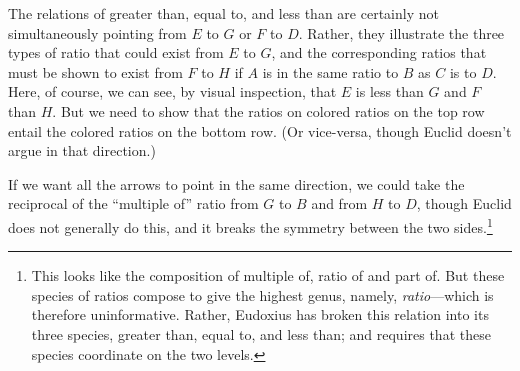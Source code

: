 \documentclass[11pt]{article}
\newcommand{\flushleftright}{\noindent\justifying}
\begin{document}

\flushleftright%
The relations of greater than, equal to, and less than are certainly not simultaneously pointing from $E$ to $G$ or $F$ to $D.$ Rather, they illustrate the three types of ratio that could exist from $E$ to $G$, and the corresponding ratios that must be shown to exist from $F$ to $H$ if $A$ is in the same ratio to $B$ as $C$ is to $D$. Here, of course, we can see, by visual inspection, that $E$ is less than $G$ and $F$ than $H$. But we need to show that the ratios on colored ratios on the top row entail the colored ratios on the bottom row. (Or vice-versa, though Euclid doesn't argue in that direction.)

If we want all the arrows to point in the same direction, we could take the reciprocal of the ``multiple of'' ratio from $G$ to $B$ and from $H$ to $D$, though Euclid does not generally do this, and it breaks the symmetry between the two sides.\footnote{This looks like the composition of multiple of, ratio of and part of. But these species of ratios compose to give the highest genus, namely, \textit{ratio}---which is therefore uninformative. Rather, Eudoxius has broken this relation into its three species, greater than, equal to, and less than; and requires that these species coordinate on the two levels.}
\end{document}
